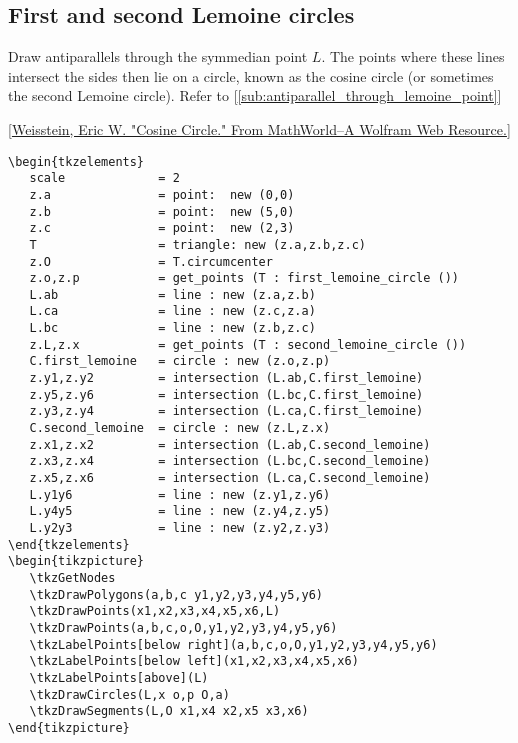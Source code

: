 
\subsection{First and second Lemoine circles} %
\label{sub:first_and_second_lemoine_circles}

Draw antiparallels through the symmedian point $L$. The points where these lines intersect the sides then lie on a circle, known as the cosine circle (or sometimes the second Lemoine circle). Refer to [\ref{sub:antiparallel_through_lemoine_point}]

[\href{https://mathworld.wolfram.com/CosineCircle.html}{Weisstein, Eric W. "Cosine Circle." From MathWorld--A Wolfram Web Resource.}]


\begin{Verbatim}
\begin{tkzelements}
   scale             = 2
   z.a               = point:  new (0,0)
   z.b               = point:  new (5,0)
   z.c               = point:  new (2,3)
   T                 = triangle: new (z.a,z.b,z.c)
   z.O               = T.circumcenter
   z.o,z.p           = get_points (T : first_lemoine_circle ())
   L.ab              = line : new (z.a,z.b)
   L.ca              = line : new (z.c,z.a)
   L.bc              = line : new (z.b,z.c)
   z.L,z.x           = get_points (T : second_lemoine_circle ())
   C.first_lemoine   = circle : new (z.o,z.p)
   z.y1,z.y2         = intersection (L.ab,C.first_lemoine)
   z.y5,z.y6         = intersection (L.bc,C.first_lemoine)
   z.y3,z.y4         = intersection (L.ca,C.first_lemoine)
   C.second_lemoine  = circle : new (z.L,z.x)
   z.x1,z.x2         = intersection (L.ab,C.second_lemoine)
   z.x3,z.x4         = intersection (L.bc,C.second_lemoine)
   z.x5,z.x6         = intersection (L.ca,C.second_lemoine)
   L.y1y6            = line : new (z.y1,z.y6)
   L.y4y5            = line : new (z.y4,z.y5)
   L.y2y3            = line : new (z.y2,z.y3)
\end{tkzelements}
\begin{tikzpicture}
   \tkzGetNodes
   \tkzDrawPolygons(a,b,c y1,y2,y3,y4,y5,y6)
   \tkzDrawPoints(x1,x2,x3,x4,x5,x6,L)
   \tkzDrawPoints(a,b,c,o,O,y1,y2,y3,y4,y5,y6)
   \tkzLabelPoints[below right](a,b,c,o,O,y1,y2,y3,y4,y5,y6)
   \tkzLabelPoints[below left](x1,x2,x3,x4,x5,x6)
   \tkzLabelPoints[above](L)
   \tkzDrawCircles(L,x o,p O,a)
   \tkzDrawSegments(L,O x1,x4 x2,x5 x3,x6)
\end{tikzpicture}
\end{Verbatim}

